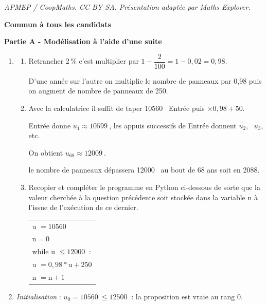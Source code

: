 \documentclass[10pt]{article}
\providecommand{\np}[2][]{{#2~#1}}
\begin{document}
\noindent\textit{APMEP / CoopMaths. CC BY-SA. Présentation adaptée par Maths Explorer.}\par\medskip
\textbf{Commun à tous les candidats}

\medskip







\textbf{Partie A - Modélisation à l'aide d'une suite}

\medskip



\medskip

\begin{enumerate}
\item 
	\begin{enumerate}
		\item  
Retrancher 2\,\% c'est multiplier par $1 - \dfrac{2}{100} = 1 - 0,02 = 0,98$.

D'une année sur l'autre on multiplie le nombre de panneaux par 0,98 puis on augment de nombre de panneaux de 250.
		\item  
		

Avec la calculatrice il suffit de taper \np{10560} Entrée puis $\times 0,98 + 50$.

Entrée donne $u_1 \approx \np{10599}$, les appuis successifs de Entrée donnent $u_2$, \, $u_3$, etc.

On obtient $u_{68} \approx \np{12009}$.

le nombre de panneaux dépassera \np{12000} au bout de 68 ans soit en 2088.
		\item  Recopier et compléter le programme en Python ci-dessous de sorte que la valeur
cherchée à la question précédente soit stockée dans la variable n à l'issue de l'exécution de ce dernier.
\begin{center}
\begin{tabular}{|l|}\hline
u $= \np{10560}$\\
n$ =0$\\
while  u $\leqslant \np{12000}$ :\\
\qquad u $= 0,98*\text{u} + 250$  \\
\qquad n $= \text{n} + 1$\\ \hline
\end{tabular}
\end{center}

	\end{enumerate}
\item 
\emph{Initialisation }: $u_0 = \np{10560} \leqslant \np{12500}$ : la proposition est vraie au rang 0.


\end{enumerate}
\end{document}
